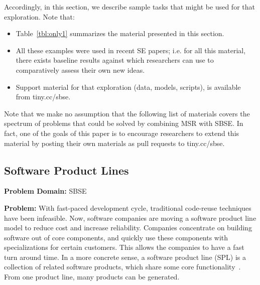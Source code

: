 \documentclass[sigconf,anonymous,review]{acmart}
\newcommand\TODO[1]{\textcolor{ScarletRed}{\textbf{\colorbox{yellow}{\small TODO:}} \emph{#1}}\xspace}
\begin{document}
Accordingly, in this section, we describe sample
tasks that might be used for that exploration.
Note that:
\begin{itemize}[leftmargin=*]
\item
Table~\ref{tbl:only1} summarizes the material presented in this section. 
\item All these examples were used in recent SE
papers; i.e. for all this material, there exists baseline results against which researchers can use to  comparatively
assess  their own new ideas.
\item
Support material for that exploration (data, models, scripts),
is available from tiny.cc/sbse.



\end{itemize}
Note that we make no assumption that the following list of materials
covers the spectrum of problems that could be solved by combining MSR with SBSE. In fact, one of the goals of this paper is to encourage researchers to extend this material by posting their own materials as pull requests to tiny.cc/sbse.

    \subsection{Software Product Lines}\label{spl}
    \textbf{Problem Domain: } SBSE
    
    \noindent\textbf{Problem:} With fast-paced development cycle, traditional code-reuse techniques have been infeasible. Now, software companies are moving a software product line model to reduce cost and increase reliability. Companies concentrate on building software out of core components, and quickly use these components with specializations for certain customers. This allows the companies to have a fast turn around time. In a more concrete sense, a software product line (SPL) is a collection of related software products, which share some core functionality~\cite{harman2014search}. From one product line, many products can be generated. 
    
\end{document}
